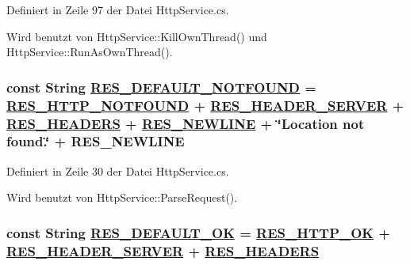 Definiert in Zeile 97 der Datei Http\-Service.cs.

Wird benutzt von Http\-Service::Kill\-Own\-Thread() und Http\-Service::Run\-As\-Own\-Thread().\hypertarget{classQbeSAS_1_1HttpService_QbeSAS_1_1HttpServicer11}{
\subsubsection[RES\_\-DEFAULT\_\-NOTFOUND]{\setlength{\rightskip}{0pt plus 5cm}const String \hyperlink{classQbeSAS_1_1HttpService_QbeSAS_1_1HttpServicer11}{RES\_\-DEFAULT\_\-NOTFOUND} = \hyperlink{classQbeSAS_1_1HttpService_QbeSAS_1_1HttpServicer8}{RES\_\-HTTP\_\-NOTFOUND} + \hyperlink{classQbeSAS_1_1HttpService_QbeSAS_1_1HttpServicer1}{RES\_\-HEADER\_\-SERVER} + \hyperlink{classQbeSAS_1_1HttpService_QbeSAS_1_1HttpServicer2}{RES\_\-HEADERS} + \hyperlink{classQbeSAS_1_1HttpService_QbeSAS_1_1HttpServicer0}{RES\_\-NEWLINE} + \char`\"{}Location not found.\char`\"{} + RES\_\-NEWLINE}}
\label{classQbeSAS_1_1HttpService_QbeSAS_1_1HttpServicer11}




Definiert in Zeile 30 der Datei Http\-Service.cs.

Wird benutzt von Http\-Service::Parse\-Request().\hypertarget{classQbeSAS_1_1HttpService_QbeSAS_1_1HttpServicer10}{
\subsubsection[RES\_\-DEFAULT\_\-OK]{\setlength{\rightskip}{0pt plus 5cm}const String \hyperlink{classQbeSAS_1_1HttpService_QbeSAS_1_1HttpServicer10}{RES\_\-DEFAULT\_\-OK} = \hyperlink{classQbeSAS_1_1HttpService_QbeSAS_1_1HttpServicer6}{RES\_\-HTTP\_\-OK} + \hyperlink{classQbeSAS_1_1HttpService_QbeSAS_1_1HttpServicer1}{RES\_\-HEADER\_\-SERVER} + \hyperlink{classQbeSAS_1_1HttpService_QbeSAS_1_1HttpServicer2}{RES\_\-HEADERS}}}
\label{classQbeSAS_1_1HttpService_QbeSAS_1_1HttpServicer10}





